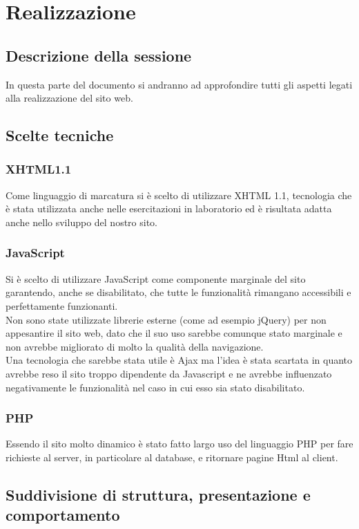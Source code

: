 \documentclass[openany, a4paper, 12pt]{report}
\begin{document}
	\chapter{Realizzazione}
		\section{Descrizione della sessione}
		In questa parte del documento si andranno ad approfondire tutti gli aspetti legati alla realizzazione del sito web.

	\section{Scelte tecniche}
		\subsection{XHTML1.1}
		Come linguaggio di marcatura si è scelto di utilizzare XHTML 1.1, tecnologia che è stata utilizzata anche nelle esercitazioni in laboratorio ed è risultata adatta anche nello sviluppo del nostro sito.\\
		
		\subsection{JavaScript}
		Si è scelto di utilizzare JavaScript come componente marginale del sito garantendo, anche se disabilitato, che tutte le funzionalità rimangano accessibili e perfettamente funzionanti.\\
		Non sono state utilizzate librerie esterne (come ad esempio jQuery) per non appesantire il sito web, dato che il suo uso sarebbe comunque stato marginale e non avrebbe migliorato di molto la qualità della navigazione.\\
		Una tecnologia che sarebbe stata utile è Ajax ma l'idea è stata scartata in quanto avrebbe reso il sito troppo dipendente da Javascript e ne avrebbe influenzato negativamente le funzionalità nel caso in cui esso sia stato disabilitato.
		
		\subsection{PHP}
		Essendo il sito molto dinamico è stato fatto largo uso del linguaggio PHP per fare richieste al server, in particolare al database, e ritornare pagine Html al client.

	\section{Suddivisione di struttura, presentazione e comportamento}
\end{document}
